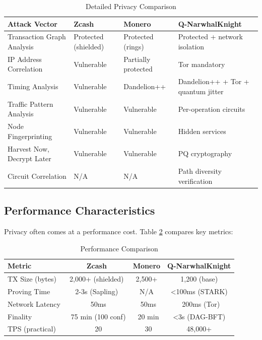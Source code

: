 \documentclass[11pt,a4paper]{article}
\begin{document}
\begin{table}[H]
\centering
\caption{Detailed Privacy Comparison}
\label{tab:detailed_comparison}
\begin{tabular}{@{}p{4cm}p{3cm}p{3cm}p{4cm}@{}}
\toprule
\textbf{Attack Vector} & \textbf{Zcash} & \textbf{Monero} & \textbf{Q-NarwhalKnight} \\
\midrule
Transaction Graph Analysis & Protected (shielded) & Protected (rings) & Protected + network isolation \\
\addlinespace
IP Address Correlation & Vulnerable & Partially protected & Tor mandatory \\
\addlinespace
Timing Analysis & Vulnerable & Dandelion++ & Dandelion++ + Tor + quantum jitter \\
\addlinespace
Traffic Pattern Analysis & Vulnerable & Vulnerable & Per-operation circuits \\
\addlinespace
Node Fingerprinting & Vulnerable & Vulnerable & Hidden services \\
\addlinespace
Harvest Now, Decrypt Later & Vulnerable & Vulnerable & PQ cryptography \\
\addlinespace
Circuit Correlation & N/A & N/A & Path diversity verification \\
\bottomrule
\end{tabular}
\end{table}

\subsection{Performance Characteristics}

Privacy often comes at a performance cost. Table \ref{tab:performance} compares key metrics:

\begin{table}[H]
\centering
\caption{Performance Comparison}
\label{tab:performance}
\begin{tabular}{@{}lccc@{}}
\toprule
\textbf{Metric} & \textbf{Zcash} & \textbf{Monero} & \textbf{Q-NarwhalKnight} \\
\midrule
TX Size (bytes) & 2,000+ (shielded) & 2,500+ & 1,200 (base) \\
Proving Time & 2-3s (Sapling) & N/A & <100ms (STARK) \\
Network Latency & ~50ms & ~50ms & ~200ms (Tor) \\
Finality & ~75 min (100 conf) & ~20 min & <3s (DAG-BFT) \\
TPS (practical) & ~20 & ~30 & 48,000+ \\
\bottomrule
\end{tabular}
\end{table}
\end{document}
